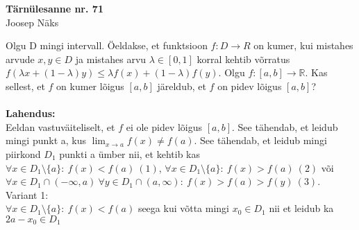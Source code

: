 \documentclass{article}
\begin{document}
\begin{center}
\Large\textbf{T\"arn\"ulesanne nr. 71}\\
\small{Joosep N\"aks}
\end{center}
Olgu D mingi intervall. \"Oeldakse, et funktsioon $f:D\to R$ on kumer, kui mistahes arvude $x,y\in D$ ja mistahes arvu $\lambda\in [0, 1]$ korral kehtib v\~orratus $f(\lambda x+(1-\lambda)y)\leq\lambda f(x)+(1-\lambda)f(y)$. Olgu $f: [a,b]\to \mathbb{R}$. Kas sellest, et $f$ on kumer l\~oigus $[a,b]$ j\"areldub, et $f$ on pidev l\~oigus $[a,b]$?\\\\
\textbf{Lahendus:}\\
Eeldan vastuv\"aiteliselt, et $f$ ei ole pidev l\~oigus $[a,b]$. See t\"ahendab, et leidub mingi punkt a, kus $\displaystyle\lim_{x\to a}f(x)\neq f(a)$. See t\"ahendab, et leidub mingi piirkond $D_1$ punkti a \"umber nii, et kehtib kas $\forall x\in D_1\setminus \{a\}:\ f(x)<f(a)\ (1)$, $\forall x\in D_1\setminus \{a\}:\ f(x)>f(a)\ (2)$ v\~oi $\forall x\in D_1\cap (-\infty, a)\ \forall y\in D_1\cap (a, \infty):\ f(x)>f(a)>f(y)\ (3)$.\\
Variant 1:\\
$\forall x\in D_1\setminus \{a\}:\ f(x)<f(a)$ seega kui v\~otta mingi $x_0\in D_1$ nii et leidub ka $2a-x_0\in D_1 $
\end{document}
